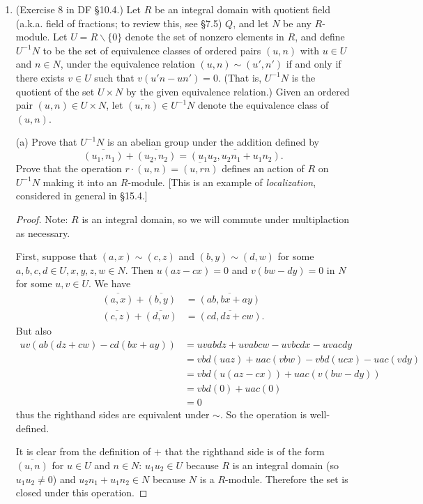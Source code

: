 \documentclass[10pt]{article}
\renewcommand{\bar}{\overline}
\begin{document}
\begin{enumerate}
\item (Exercise 8 in DF \S 10.4.) Let $R$ be an integral domain with quotient field (a.k.a. field of fractions; to review this, see \S 7.5) $Q$, and let $N$ be any $R$-module.  Let $U = R \backslash \{0\}$ denote the set of nonzero elements in $R$, and define $U^{-1}N$ to be the set of equivalence classes of ordered pairs $(u,n)$ with $u \in U$ and $n \in N$, under the equivalence relation $(u,n) \sim (u',n')$ if and only if there exists $v \in U$ such that $v(u'n - un') = 0$.  (That is, $U^{-1}N$ is the quotient of the set $U \times N$ by the given equivalence relation.)   Given an ordered pair $(u,n) \in U \times N$, let $\overline{(u,n)} \in U^{-1}N$ denote the equivalence class of $(u,n)$.

(a) Prove that $U^{-1}N$ is an abelian group under the addition defined by
\[
\overline{(u_1,n_1)} + \overline{(u_2,n_2)} = \overline{(u_1u_2, u_2n_1 + u_1n_2)} \text{.}
\]
Prove that the operation $r \cdot \overline{(u,n)} = \overline{(u,rn)}$ defines an action of $R$ on $U^{-1}N$ making it into an $R$-module.  [This is an example of \emph{localization}, considered in general in \S 15.4.]

\begin{proof}
Note: $R$ is an integral domain, so we will commute under multiplaction as necessary.

First, suppose that $(a,x) \sim (c,z)$ and $(b,y) \sim (d,w)$ for some $a,b,c,d \in U, x,y,z,w \in N$.  Then $u(az - cx) = 0$ and $v(bw - dy) = 0$ in $N$ for some $u,v \in U$.  We have
\begin{align*}
\bar{(a,x)} + \bar{(b,y)} &= \bar{(ab,bx + ay)}
\\
\bar{(c,z)} + \bar{(d,w)} &= \bar{(cd,dz+cw)}.
\end{align*}
But also
\begin{align*}
uv(ab(dz+cw) - cd(bx+ay))
&= uvabdz + uvabcw - uvbcdx - uvacdy
\\
&= vbd(uaz) + uac(vbw) - vbd(ucx) - uac(vdy)
\\
&=vbd(u(az-cx)) + uac(v(bw - dy))
\\
&= vbd(0) + uac(0)
\\
&= 0
\end{align*}
thus the righthand sides are equivalent under $\sim$.  So the operation is well-defined.

It is clear from the definition of $+$ that the righthand side is of the form $\overline{(u,n)}$ for $u \in U$ and $n \in N$: $u_1u_2 \in U$ because $R$ is an integral domain (so $u_1u_2 \neq 0$) and $u_2n_1 + u_1n_2 \in N$ because $N$ is a $R$-module.  Therefore the set is closed under this operation.


\end{proof}
\end{enumerate}
\end{document}
